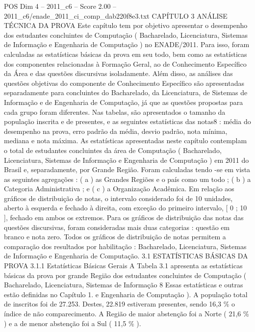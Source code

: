 \begin{textsample}{POS Dim 4 – 2011\_c6 – Score 2.00 – 2011\_c6/enade\_2011\_ci\_comp\_dab220f8e3.txt}  \label{ex:f4_pos_299}
CAPÍTULO 3 ANÁLISE TÉCNICA DA PROVA Este capítulo tem por objetivo apresentar o desempenho dos estudantes concluintes de Computação ( Bacharelado, Licenciatura, Sistemas de Informação e Engenharia de Computação ) no ENADE/2011.
Para isso, foram calculadas as estatísticas básicas da prova em seu todo, bem como as estatísticas dos componentes relacionadas à Formação Geral, ao de Conhecimento Específico da Área e das questões discursivas isoladamente.
Além disso, as análises das questões objetivas do componente de Conhecimento Específico são apresentadas separadamente para concluintes do Bacharelado, da Licenciatura, de Sistemas de Informação e de Engenharia de Computação, já que as questões propostas para cada grupo foram diferentes.
Nas tabelas, são apresentados o tamanho da população inscrita e de presentes, e as seguintes estatísticas das notas8 : média do desempenho na prova, erro padrão da média, desvio padrão, nota mínima, mediana e nota máxima.
As estatísticas apresentadas neste capítulo contemplam o total de estudantes concluintes da área de Computação ( Bacharelado, Licenciatura, Sistemas de Informação e Engenharia de Computação ) em 2011 do Brasil e, separadamente, por Grande Região.
Foram calculadas tendo -se em vista as seguintes agregações : ( a ) as Grandes Regiões e o país como um todo ; ( b ) a Categoria Administrativa ; e ( c ) a Organização Acadêmica.
Em relação aos gráficos de distribuição de notas, o intervalo considerado foi de 10 unidades, aberto à esquerda e fechado à direita, com exceção do primeiro intervalo, [ 0 ; 10 ], fechado em ambos os extremos.
Para os gráficos de distribuição das notas das questões discursivas, foram consideradas mais duas categorias : questão em branco e nota zero.
Todos os gráficos de distribuição de notas permitem a comparação dos resultados por habilitação : Bacharelado, Licenciatura, Sistemas de Informação e Engenharia de Computação. 3.1 ESTATÍSTICAS BÁSICAS DA PROVA 3.1.1 Estatísticas Básicas Gerais A Tabela 3.1 apresenta as estatísticas básicas da prova por grande Região dos estudantes concluintes de Computação ( Bacharelado, Licenciatura, Sistemas de Informação 8 Essas estatísticas e outras estão definidas no Capítulo 1. e Engenharia de Computação ).
A população total de inscritos foi de 27.253.
Destes, 22.819 estiveram presentes, sendo 16,3 \% o índice de não comparecimento.
A Região de maior abstenção foi a Norte ( 21,6 \% ) e a de menor abstenção foi a Sul ( 11,5 \% ).

\end{textsample}
